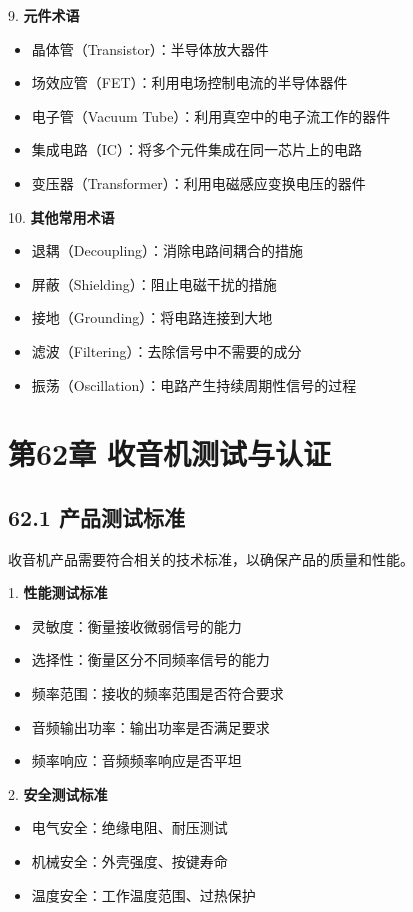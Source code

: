 \documentclass[12pt,UTF8]{ctexbook}
\begin{document}
9. \textbf{元件术语}
   \begin{itemize}[leftmargin=3.5em]
   \item 晶体管（Transistor）：半导体放大器件
   \item 场效应管（FET）：利用电场控制电流的半导体器件
   \item 电子管（Vacuum Tube）：利用真空中的电子流工作的器件
   \item 集成电路（IC）：将多个元件集成在同一芯片上的电路
   \item 变压器（Transformer）：利用电磁感应变换电压的器件
   \end{itemize}

10. \textbf{其他常用术语}
    \begin{itemize}[leftmargin=3.5em]
    \item 退耦（Decoupling）：消除电路间耦合的措施
    \item 屏蔽（Shielding）：阻止电磁干扰的措施
    \item 接地（Grounding）：将电路连接到大地
    \item 滤波（Filtering）：去除信号中不需要的成分
    \item 振荡（Oscillation）：电路产生持续周期性信号的过程
    \end{itemize}
\chapter*{第62章 收音机测试与认证}
\section*{62.1 产品测试标准}

收音机产品需要符合相关的技术标准，以确保产品的质量和性能。

1. \textbf{性能测试标准}
   \begin{itemize}[leftmargin=3.5em]
   \item 灵敏度：衡量接收微弱信号的能力
   \item 选择性：衡量区分不同频率信号的能力
   \item 频率范围：接收的频率范围是否符合要求
   \item 音频输出功率：输出功率是否满足要求
   \item 频率响应：音频频率响应是否平坦
   \end{itemize}

2. \textbf{安全测试标准}
   \begin{itemize}[leftmargin=3.5em]
   \item 电气安全：绝缘电阻、耐压测试
   \item 机械安全：外壳强度、按键寿命
   \item 温度安全：工作温度范围、过热保护
   \end{itemize}
\end{document}
